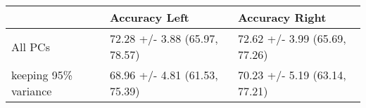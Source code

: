\begin{tabular}{lll}
\toprule
{} &                  Accuracy Left &                 Accuracy Right \\
\midrule
All PCs              &  72.28 +/- 3.88 (65.97, 78.57) &  72.62 +/- 3.99 (65.69, 77.26) \\
keeping 95\% variance &  68.96 +/- 4.81 (61.53, 75.39) &  70.23 +/- 5.19 (63.14, 77.21) \\
\bottomrule
\end{tabular}
